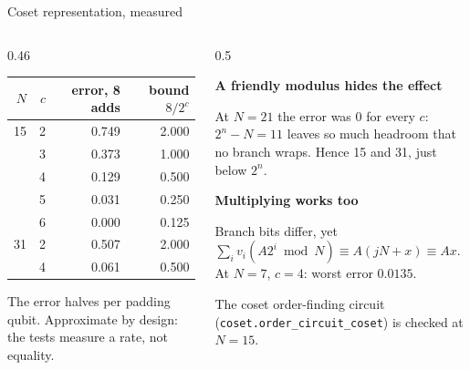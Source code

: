 \documentclass[aspectratio=169,11pt]{beamer}
\newcommand{\blocktitle}[1]{{\bfseries #1}\par\vskip1mm}
\newcommand{\peachtitle}[1]{{\bfseries\color{cverm}#1}\par\vskip1mm}
\begin{document}
\setcounter{framenumber}{63}
\begin{frame}{Coset representation, measured}
  \begin{columns}[T]
    \begin{column}{0.46\textwidth}
      \centering\footnotesize
      \renewcommand{\arraystretch}{1.04}
      \begin{tabular}{@{}rrrr@{}}
        \toprule
        $N$ & $c$ & error, 8 adds & bound $8/2^c$ \\
        \midrule
        15 & 2 & 0.749 & 2.000 \\
           & 3 & 0.373 & 1.000 \\
           & 4 & 0.129 & 0.500 \\
           & 5 & 0.031 & 0.250 \\
           & 6 & 0.000 & 0.125 \\
        \midrule
        31 & 2 & 0.507 & 2.000 \\
           & 4 & 0.061 & 0.500 \\
        \bottomrule
      \end{tabular}\par
      {\scriptsize The error halves per padding qubit. Approximate by design: the tests measure a rate, not equality.}
    \end{column}
    \begin{column}{0.5\textwidth}
      \begin{peachblock}[fontupper=\small]\peachtitle{A friendly modulus hides the effect}
        At $N=21$ the error was 0 for every $c$: $2^n-N=11$ leaves so much headroom that no branch wraps. Hence 15 and 31, just below $2^n$.
      \end{peachblock}
      \small
      \blocktitle{Multiplying works too}
      Branch bits differ, yet $\sum_iv_i(A2^i\bmod N)\equiv A(jN+x)\equiv Ax$. At $N=7$, $c=4$: worst error $0.0135$.\par
      \vskip1mm
      The coset order-finding circuit (\texttt{coset.order\_circuit\_coset}) is checked at $N=15$.
    \end{column}
  \end{columns}
\end{frame}
\end{document}
